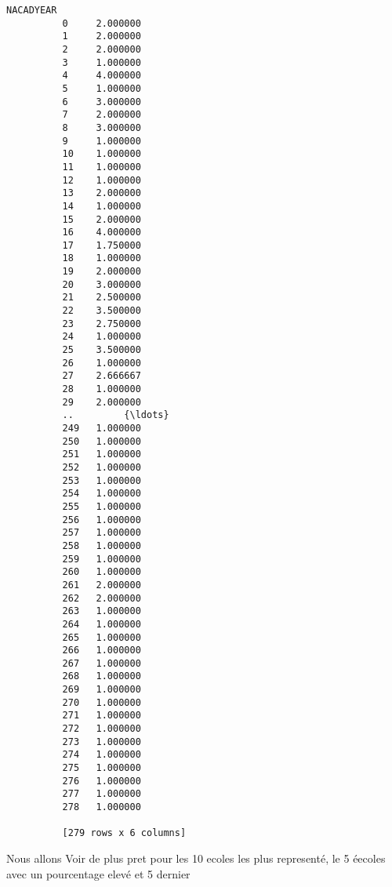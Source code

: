 \documentclass[11pt]{article}
\begin{document}
\begin{Verbatim}[commandchars=\\\{\}]
               NACADYEAR  
          0     2.000000  
          1     2.000000  
          2     2.000000  
          3     1.000000  
          4     4.000000  
          5     1.000000  
          6     3.000000  
          7     2.000000  
          8     3.000000  
          9     1.000000  
          10    1.000000  
          11    1.000000  
          12    1.000000  
          13    2.000000  
          14    1.000000  
          15    2.000000  
          16    4.000000  
          17    1.750000  
          18    1.000000  
          19    2.000000  
          20    3.000000  
          21    2.500000  
          22    3.500000  
          23    2.750000  
          24    1.000000  
          25    3.500000  
          26    1.000000  
          27    2.666667  
          28    1.000000  
          29    2.000000  
          ..         {\ldots}  
          249   1.000000  
          250   1.000000  
          251   1.000000  
          252   1.000000  
          253   1.000000  
          254   1.000000  
          255   1.000000  
          256   1.000000  
          257   1.000000  
          258   1.000000  
          259   1.000000  
          260   1.000000  
          261   2.000000  
          262   2.000000  
          263   1.000000  
          264   1.000000  
          265   1.000000  
          266   1.000000  
          267   1.000000  
          268   1.000000  
          269   1.000000  
          270   1.000000  
          271   1.000000  
          272   1.000000  
          273   1.000000  
          274   1.000000  
          275   1.000000  
          276   1.000000  
          277   1.000000  
          278   1.000000  
          
          [279 rows x 6 columns]
\end{Verbatim}
        
    Nous allons Voir de plus pret pour les 10 ecoles les plus representé, le
5 éecoles avec un pourcentage elevé et 5 dernier
\end{document}
